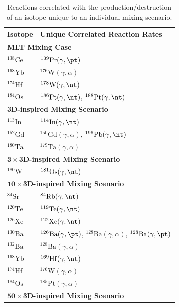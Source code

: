 \begin{table}[!htb]
\caption{Reactions correlated with the production/destruction of an isotope unique to an individual mixing scenario.
\label{tab:unique_rates}}
\centering
\begin{tabular}{ll}
\hline
\textbf{Isotope} & \textbf{Unique Correlated Reaction Rates} \\
\hline
\multicolumn{2}{l}{\textbf{MLT Mixing Case}} \\ 
$^{138}\mathrm{Ce}$ & $^{139}\mathrm{Pr}(\gamma,\pt)$ \\
$^{168}\mathrm{Yb}$ & $^{176}\mathrm{W}(\gamma,\alpha)$ \\
$^{174}\mathrm{Hf}$ & $^{178}\mathrm{W}(\gamma,\nt)$ \\
$^{184}\mathrm{Os}$ & $^{186}\mathrm{Pt}(\gamma,\nt)$, $^{188}\mathrm{Pt}(\gamma,\nt)$ \\
\hline
\multicolumn{2}{l}{\textbf{3D-inspired Mixing Scenario}} \\ 
$^{113}\mathrm{In}$ & $^{114}\mathrm{In}(\gamma,\nt)$ \\
$^{152}\mathrm{Gd}$ & $^{150}\mathrm{Gd}(\gamma,\alpha)$, $^{196}\mathrm{Pb}(\gamma,\nt)$ \\
$^{180}\mathrm{Ta}$ & $^{179}\mathrm{Ta}(\gamma,\alpha)$ \\
\hline
\multicolumn{2}{l}{$\mathbf{3\times}$\textbf{3D-inspired Mixing Scenario}} \\ 
$^{180}\mathrm{W}$ & $^{181}\mathrm{Os}(\gamma,\nt)$ \\
\hline
\multicolumn{2}{l}{$\mathbf{10\times}$\textbf{3D-inspired Mixing Scenario}} \\ 
$^{84}\mathrm{Sr}$ & $^{84}\mathrm{Rb}(\gamma,\nt)$ \\
$^{120}\mathrm{Te}$ & $^{119}\mathrm{Te}(\gamma,\nt)$ \\
$^{126}\mathrm{Xe}$ & $^{122}\mathrm{Xe}(\gamma,\nt)$ \\
$^{130}\mathrm{Ba}$ & $^{126}\mathrm{Ba}(\gamma,\pt)$, $^{128}\mathrm{Ba}(\gamma,\alpha)$, $^{128}\mathrm{Ba}(\gamma,\pt)$ \\
$^{132}\mathrm{Ba}$ & $^{128}\mathrm{Ba}(\gamma,\alpha)$ \\
$^{168}\mathrm{Yb}$ & $^{169}\mathrm{Hf}(\gamma,\nt)$ \\
$^{174}\mathrm{Hf}$ & $^{176}\mathrm{W}(\gamma,\alpha)$ \\
$^{184}\mathrm{Os}$ & $^{185}\mathrm{Pt}(\gamma,\alpha)$ \\
\hline
\multicolumn{2}{l}{$\mathbf{50\times}$\textbf{3D-inspired Mixing Scenario}} \\ 

\end{tabular}
\end{table}
